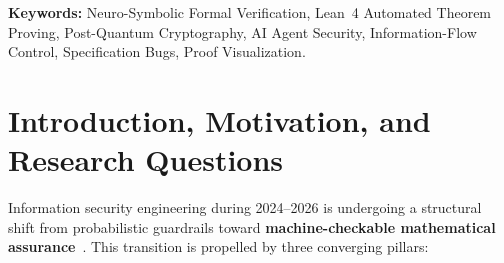 \documentclass[10pt,twocolumn]{article}
\begin{document}
\begin{abstract}
auditing~\cite{ye2026verina,miranda2026veribench,han2026shadowbench,ammanamanchi2026faults,chen2026reform,mei2026beyondllm,threesurface2026,misu2026specharness,amster2026claimcheck,nawrocki2023proofwidgets4,kripner2025leantree}.
\end{abstract}

\vspace{-0.4em}
\noindent\begin{minipage}{\columnwidth}
\small\noindent\textbf{Keywords:} Neuro-Symbolic Formal Verification, Lean~4 Automated Theorem Proving, Post-Quantum Cryptography, AI Agent Security, Information-Flow Control, Specification Bugs, Proof Visualization.
\end{minipage}\par\vspace{0.3em}

\section{Introduction, Motivation, and Research Questions}
\label{sec:intro}

Information security engineering during 2024--2026 is undergoing a structural shift from probabilistic guardrails toward \textbf{machine-checkable mathematical assurance}~\cite{ho2026symcrypt,debenedetti2026camel}. This transition is propelled by three converging pillars:
\end{document}
